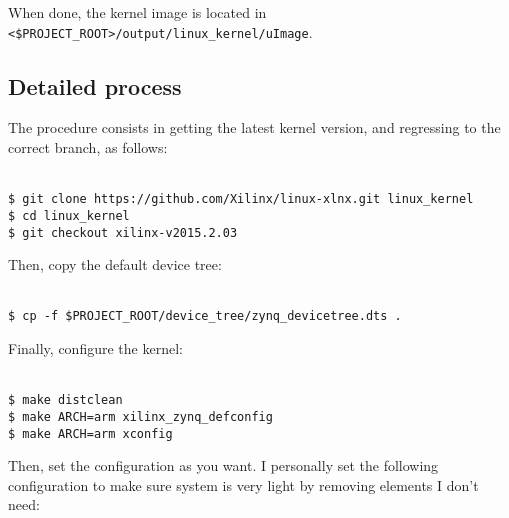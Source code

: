 \documentclass[openany,a4paper]{book}
\begin{document}
When done, the kernel image is located in \nolinkurl{<$PROJECT_ROOT>/output/linux_kernel/uImage}.

\subsection{Detailed process}

The procedure consists in getting the latest kernel version, and regressing to the correct branch, as follows:

\begin{tabbing}
\kill \hspace{1cm} \= \\
\> \texttt{\$ git clone https://github.com/Xilinx/linux-xlnx.git linux_kernel} \\
\> \texttt{\$ cd linux_kernel} \\
\> \texttt{\$ git checkout xilinx-v2015.2.03} \\
\end{tabbing}

Then, copy the default device tree:

\begin{tabbing}
\kill \hspace{1cm} \= \\
\> \texttt{\$ cp -f \$PROJECT\_ROOT/device\_tree/zynq\_devicetree.dts .}\\
\end{tabbing}

Finally, configure the kernel:

\begin{tabbing}
\kill \hspace{1cm} \= \\
\> \texttt{\$ make distclean}\\
\> \texttt{\$ make ARCH=arm xilinx\_zynq\_defconfig}\\
\> \texttt{\$ make ARCH=arm xconfig}\\
\end{tabbing}

Then, set the configuration as you want.
I personally set the following configuration to make sure system is very light by removing elements I don't need:
\end{document}
